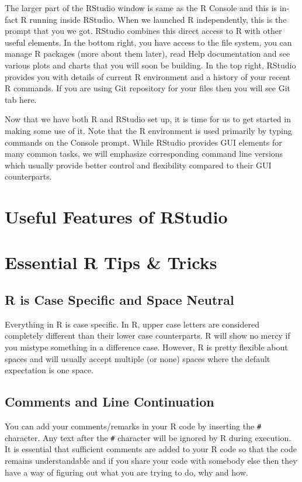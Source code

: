 \documentclass[11pt, letterpaper, twoside]{memoir}\usepackage{knitr}
\begin{document}
The larger part of the RStudio window is same as the R Console and this is in-fact R running inside RStudio. When we launched R independently, this is the prompt that you we got. RStudio combines this direct access to R with other useful elements. In the bottom right, you have access to the file system, you can manage R packages (more about them later), read Help documentation and see various plots and charts that you will soon be building. In the top right, RStudio provides you with details of current R environment and a history of your recent R commands. If you are using Git repository for your files then you will see Git tab here.

Now that we have both R and RStudio set up, it is time for us to get started in making some use of it. Note that the R environment is used primarily by typing commands on the Console prompt. While RStudio provides GUI elements for many common tasks, we will emphasize corresponding command line versions which usually provide better control and flexibility compared to their GUI counterparts. 

\section{Useful Features of RStudio}


\section{Essential R Tips \& Tricks}

\subsection{R is Case Specific and Space Neutral}

Everything in R is case specific. In R, upper case letters are considered completely different than their lower case counterparts. R will show no mercy if you mistype something in a difference case. However, R is pretty flexible about spaces and will usually accept multiple (or none) spaces where the default expectation is one space. 

\subsection{Comments and Line Continuation}

You can add your comments/remarks in your R code by inserting the \verb|#| character. Any text after the \verb|#| character will be ignored by R during execution. It is essential that sufficient comments are added to your R code so that the code remains understandable and if you share your code with somebody else then they have a way of figuring out what you are trying to do, why and how.
\end{document}
